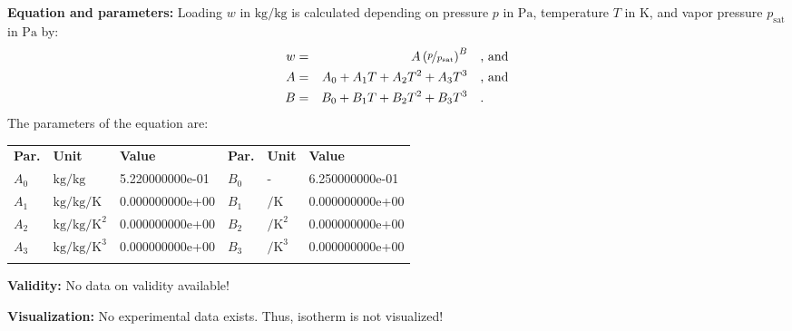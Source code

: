 \textbf{Equation and parameters:}
\newline
%
Loading $w$ in $\si{\kilogram\per\kilogram}$ is calculated depending on pressure $p$ in $\si{\pascal}$, temperature $T$ in $\si{\kelvin}$, and vapor pressure $p_\mathrm{sat}$ in $\si{\pascal}$ by:
%
\begin{equation*}
\begin{split}
w &=& A \left( \nicefrac{p}{p_\mathrm{sat}} \right) ^{B} & \quad\text{, and} \\
A &=& A_0 + A_1 T + A_2 T^2 + A_3 T^3 & \quad\text{, and} \\
B &=& B_0 + B_1 T + B_2 T^2 + B_3 T^3 & \quad\text{.} \\
\end{split}
\end{equation*}
%
The parameters of the equation are:
%
\begin{longtable}[l]{lll|lll}
\toprule
\addlinespace
\textbf{Par.} & \textbf{Unit} & \textbf{Value} &	\textbf{Par.} & \textbf{Unit} & \textbf{Value} \\
\addlinespace
\midrule
\endhead

\bottomrule
\endfoot
\bottomrule
\endlastfoot
\addlinespace

$A_0$ & $\si{\kilogram\per\kilogram}$ & 5.220000000e-01 & $B_0$ & - & 6.250000000e-01 \\
$A_1$ & $\si{\kilogram\per\kilogram\per\kelvin}$ & 0.000000000e+00 & $B_1$ & $\si{\per\kelvin}$ & 0.000000000e+00 \\
$A_2$ & $\si{\kilogram\per\kilogram\per\square\kelvin}$ & 0.000000000e+00 & $B_2$ & $\si{\per\square\kelvin}$ & 0.000000000e+00 \\
$A_3$ & $\si{\kilogram\per\kilogram\per\cubic\kelvin}$ & 0.000000000e+00 & $B_3$ & $\si{\per\cubic\kelvin}$ & 0.000000000e+00 \\

\addlinespace\end{longtable}

\textbf{Validity:}
\newline
No data on validity available!
\newline

\textbf{Visualization:}
%
\newline
No experimental data exists. Thus, isotherm is not visualized!
%

\FloatBarrier
\newpage
